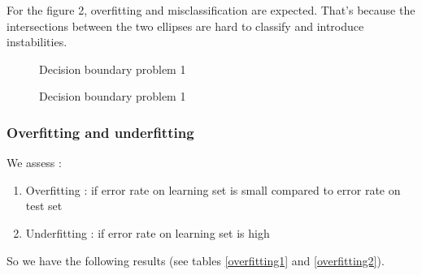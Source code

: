 \documentclass{article}
\begin{document}
For the figure 2, overfitting and misclassification are expected. That's because the intersections between the two
ellipses are hard to classify and introduce instabilities.




\begin{figure}[htbp]
  \centering
  \subfloat{ }
  \subfloat{ }

  \subfloat{ }
  \subfloat{ }

  \subfloat{ }
  
  \caption{\label{boundary1}Decision boundary problem 1}
\end{figure}

\begin{figure}[htbp]
  \centering
  \subfloat{ }
  \subfloat{ }

  \subfloat{ }
  \subfloat{ }
  
  \subfloat{ }

  \caption{\label{boundary2}Decision boundary problem 1}
\end{figure}
\FloatBarrier


\subsubsection{Overfitting and underfitting}

We assess :
\begin{enumerate}
\item Overfitting : if error rate on learning set is small compared to error rate on test set
\item Underfitting : if error rate on learning set is high
\end{enumerate}

So we have the following results (see tables \ref{overfitting1} and \ref{overfitting2}).
\end{document}

